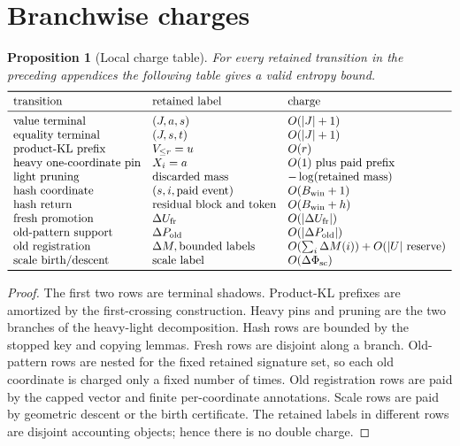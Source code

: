 \documentclass[11pt]{article}
\newtheorem{proposition}[theorem]{Proposition}
\theoremstyle{remark}
\newcommand{\old}{\mathrm{old}}
\newcommand{\fr}{\mathrm{fr}}
\newcommand{\scal}{\mathrm{sc}}
\begin{document}
\section{Branchwise charges}\label{app:charges}

\begin{proposition}[Local charge table]\label{prop:app-local-charge-table}
For every retained transition in the preceding appendices the following table gives a valid entropy bound.
\[
\begin{array}{lll}
\toprule
\hbox{transition} & \hbox{retained label} & \hbox{charge}\\
\midrule
\hbox{value terminal} & (J,a,s) & O(|J|+1)\\
\hbox{equality terminal} & (J,s,t) & O(|J|+1)\\
\hbox{product-KL prefix} & V_{\le r}=u & O(r)\\
\hbox{heavy one-coordinate pin} & X_i=a & O(1)\hbox{ plus paid prefix}\\
\hbox{light pruning} & \hbox{discarded mass} & -\log(\hbox{retained mass})\\
\hbox{hash coordinate} & (s,i,\hbox{paid event}) & O(B_{\rm win}+1)\\
\hbox{hash return} & \hbox{residual block and token} & O(B_{\rm win}+h)\\
\hbox{fresh promotion} & \Delta U_{\fr} & O(|\Delta U_{\fr}|)\\
\hbox{old-pattern support} & \Delta P_{\old} & O(|\Delta P_{\old}|)\\
\hbox{old registration} & \Delta M,\hbox{bounded labels} & O(\sum_i\Delta M(i))+O(|U|\hbox{ reserve})\\
\hbox{scale birth/descent} & \hbox{scale label} & O(\Delta\Phi_{\scal})\\
\bottomrule
\end{array}
\]
\end{proposition}

\begin{proof}
The first two rows are terminal shadows.  Product-KL prefixes are amortized by the first-crossing construction.  Heavy pins and pruning are the two branches of the heavy-light decomposition.  Hash rows are bounded by the stopped key and copying lemmas.  Fresh rows are disjoint along a branch.  Old-pattern rows are nested for the fixed retained signature set, so each old coordinate is charged only a fixed number of times.  Old registration rows are paid by the capped vector and finite per-coordinate annotations.  Scale rows are paid by geometric descent or the birth certificate.  The retained labels in different rows are disjoint accounting objects; hence there is no double charge.
\end{proof}
\end{document}
